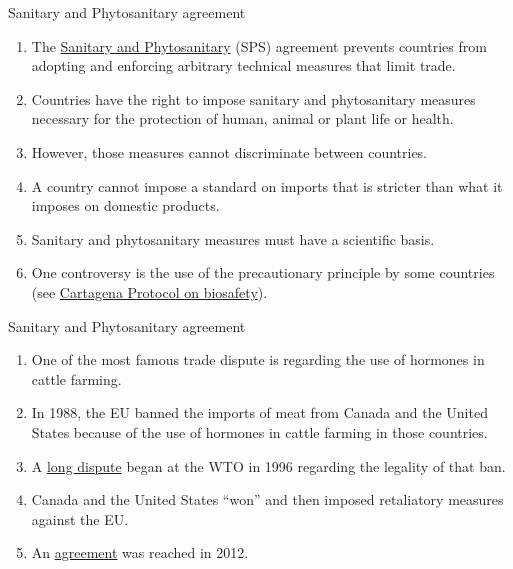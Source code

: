 \documentclass[table,xcolor=pdftex,dvipsnames]{beamer}\usepackage[]{graphicx}\usepackage[]{color}
\begin{document}
\begin{frame}{Sanitary and Phytosanitary agreement}
\begin{enumerate}[label=\textbullet]
    \item The \href{http://www.wto.org/english/tratop_e/sps_e/spsagr_e.htm}{Sanitary and Phytosanitary} (SPS) agreement prevents countries from adopting and enforcing arbitrary technical measures that limit trade.
    \item Countries have the right to impose sanitary and phytosanitary measures necessary for the protection of human, animal or plant life or health.
    \item However, those measures cannot discriminate between countries.
    \item A country cannot impose a standard on imports that is stricter than what it imposes on domestic products.
    \item Sanitary and phytosanitary measures must have a scientific basis.
    \item One controversy is the use of the precautionary principle by some countries (see \href{http://bch.cbd.int/protocol/}{Cartagena Protocol on biosafety}).
\end{enumerate}
\end{frame}


\begin{frame}{Sanitary and Phytosanitary agreement}
\begin{enumerate}[label=\textbullet]
    \item One of the most famous trade dispute is regarding the use of hormones in cattle farming.
    \item In 1988, the EU banned the imports of meat from Canada and the United States because of the use of hormones in cattle farming in those countries.
    \item A \href{http://www.wto.org/english/tratop_e/dispu_e/cases_e/ds26_e.htm}{long dispute} began at the WTO in 1996 regarding the legality of that ban.
    \item Canada and the United States ``won'' and then imposed retaliatory measures against the EU.
    \item An \href{http://www.reuters.com/article/2012/03/14/eu-trade-beef-idUSL5E8EE50620120314}{agreement} was reached in 2012.
\end{enumerate}
\end{frame}
\end{document}

